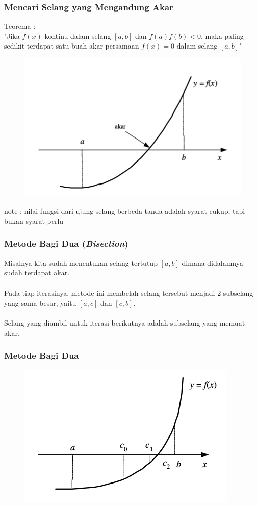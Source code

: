 \documentclass{beamer}
\begin{document}
\begin{frame}
\frametitle{Mencari Selang yang Mengandung Akar}
Teorema :
\\"Jika $f(x)$ kontinu dalam selang $[a,b]$ dan $f(a)f(b)<0$, maka paling sedikit terdapat satu buah akar persamaan $f(x)=0$ dalam selang $[a,b]$"
\begin{figure}[htp]
\centering
\includegraphics[scale=.50]{PosisiAkar.png}
\end{figure}
note : nilai fungsi dari ujung selang berbeda tanda adalah syarat cukup, tapi bukan syarat perlu
\end{frame}


\begin{frame}
\frametitle{Metode Bagi Dua (\textit{Bisection})}
Misalnya kita sudah menentukan selang tertutup $[a,b]$ dimana didalamnya sudah terdapat akar. \\\ \\Pada tiap iterasinya, metode ini membelah selang tersebut menjadi 2 subselang yang sama besar, yaitu $[a,c]$ dan $[c,b]$. \\\ \\Selang yang diambil untuk iterasi berikutnya adalah subselang yang memuat akar.
\end{frame}


\begin{frame}
\frametitle{Metode Bagi Dua}
\begin{figure}[htp]
\centering
\includegraphics[scale=0.50]{AlurBagiDua.png}
\end{figure}
\end{frame}
\end{document}
